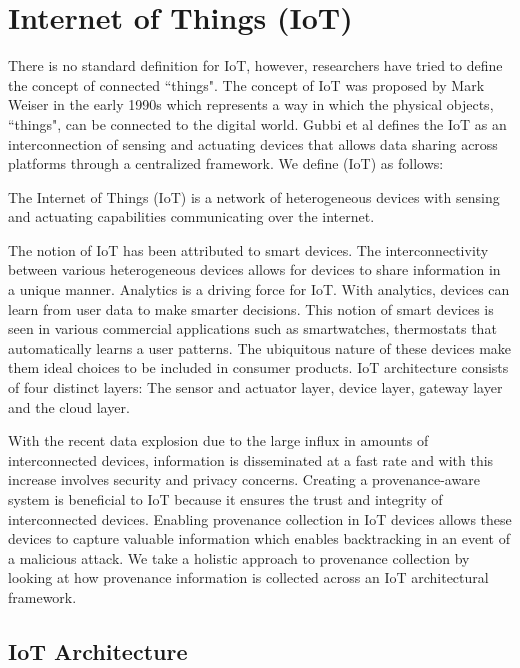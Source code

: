  
\section{Internet of Things (IoT)}
There is no standard definition for IoT, however, researchers have tried to define the concept of connected ``things". The concept of IoT was proposed by Mark Weiser in the early 1990s \cite{Mattern} which represents a way in which the physical objects, ``things", can be connected to the digital world. Gubbi et al \cite{park_provenance-based_2012} defines the IoT as  an interconnection of sensing and actuating devices that allows data sharing across platforms through a centralized framework. We define (IoT) as follows:

\begin{definition}
The Internet of Things (IoT) is a network of heterogeneous devices with sensing and actuating capabilities communicating over the internet. 

\end{definition}

The notion of IoT has been attributed to smart devices. The interconnectivity between various heterogeneous devices allows for devices to share information in a unique manner. Analytics is a driving force for IoT. With analytics, devices can learn from user data to make smarter decisions. This notion of smart devices is seen in various commercial applications such as smartwatches, thermostats that automatically learns a user patterns. The ubiquitous nature of these devices make them ideal choices to be included in consumer products. IoT architecture consists of four distinct layers: The sensor and actuator layer, device layer, gateway layer and the cloud layer. 

\par With the recent data explosion \cite{emc_bigdata} due to the large influx in amounts of interconnected devices, information is disseminated at a fast rate and with this increase involves security and privacy concerns. Creating a provenance-aware system is beneficial to IoT because it ensures the trust and  integrity of interconnected devices. Enabling provenance collection in IoT devices allows these devices to capture valuable information which enables backtracking in an event of a malicious attack. We take a holistic approach to provenance collection by looking at how provenance information is collected across an IoT architectural framework.

 
  \subsection{IoT Architecture}


